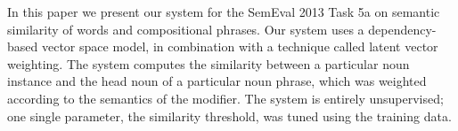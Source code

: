 In this paper we present our system for the SemEval 2013 Task 5a on semantic similarity of words and compositional phrases. Our system uses a
 dependency-based vector space model, in combination with a technique called
 latent vector weighting. The system computes the similarity between a
 particular noun instance and the head noun of a particular noun phrase, which
 was weighted according to the semantics of the modifier. The system is entirely
 unsupervised; one single parameter, the similarity threshold, was tuned using
 the training data.


